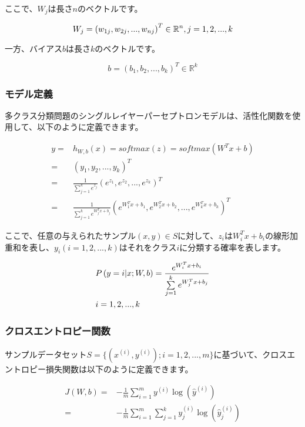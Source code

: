 \begin{content}
\begin{content}
ここで、$W_j$は長さ$n$のベクトルです。

\[
{W_j} = {\left( {{w_{1j}},{w_{2j}},...,{w_{nj}}} \right)^T} \in {\mathbb{R}^n}, j = 1,2,...,k \\
\]

一方、バイアス$b$は長さ$k$のベクトルです。

\[
b = {({b_1},{b_2},...,{b_k})^T} \in {\mathbb{R}^k}
\]

\subsubsection{モデル定義}

多クラス分類問題のシングルレイヤーパーセプトロンモデルは、活性化関数を使用して、以下のように定義できます。

\[\begin{aligned}
  y =  & {h_{W,b}}(x) = softmax (z) = softmax ({W^T}x + b) \\ 
   =  & {\left( {{y_1},{y_2},...,{y_k}} \right)^T} \\ 
   =  & \frac{1}{{\sum\limits_{j = 1}^k {{e^{{z_j}}}} }}{\left( {{e^{{z_1}}},{e^{{z_2}}},...,{e^{{z_k}}}} \right)^T} \\ 
   =  & \frac{1}{{\sum\limits_{j = 1}^k {{e^{W_j^Tx + {b_j}}}} }}{\left( {{e^{W_1^Tx + {b_1}}},{e^{W_2^Tx + {b_2}}},...,{e^{W_k^Tx + {b_k}}}} \right)^T} \ 
\end{aligned} \]

ここで、任意の与えられたサンプル$ (x, y) \in S $に対して、$ z_i $は$W_i^Tx+b_i$の線形加重和を表し、$y_i(i=1,2,...,k)$はそれをクラス$i$に分類する確率を表します。

\[\begin{gathered}
  P\left( {y = i|x;W,b} \right) = \frac{{{e^{W_i^Tx + b_i}}}}{{\sum\limits_{j = 1}^k {{e^{W_j^Tx + b_j}}} }} \hfill \\
  i = 1,2,...,k \hfill \\ 
\end{gathered} \]


\subsubsection{クロスエントロピー関数}

サンプルデータセット$ S = \{ ({x^{(i)}},{y^{(i)}});i = 1,2,...,m\} $に基づいて、クロスエントロピー損失関数は以下のように定義できます。

\[\begin{aligned}
  J(W,b) =  &  - \frac{1}{m}\sum\limits_{i = 1}^m {{y^{(i)}}\log \left( {{{\widehat y}^{(i)}}} \right)}  \\ 
   =  &  - \frac{1}{m}\sum\limits_{i = 1}^m {\sum\limits_{j = 1}^k {y_j^{(i)}\log \left( {\widehat y_j^{(i)}} \right)} }  \\
\end{aligned} \]


\end{content}
\end{content}
